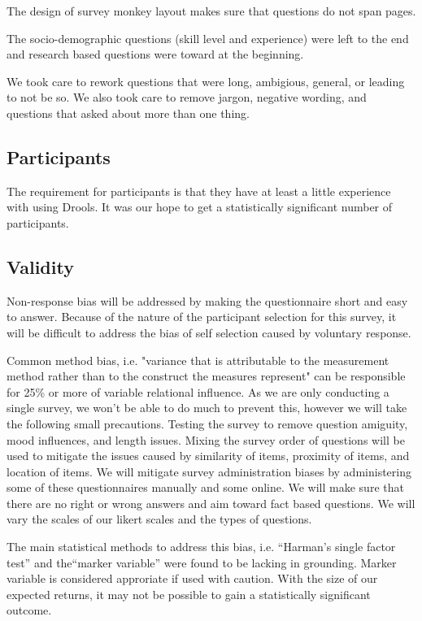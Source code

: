 The design of survey monkey layout makes sure that questions do not span pages.

The socio-demographic questions (skill level and experience) were left to the end and research based questions were toward at the beginning.

We took care to rework questions that were long, ambigious, general, or leading to not be so.
We also took care to remove jargon, negative wording, and questions that asked about more than one thing.

\subsection{Participants}

The requirement for participants is that they have at least a little experience with using Drools.
It was our hope to get a statistically significant number of participants.

\subsection{Validity}
Non-response bias\cite{armstrong1977estimating} will be addressed by making the questionnaire short and easy to answer.
Because of the nature of the participant selection for this survey, it will be difficult to address the bias of self selection caused by voluntary response.

Common method bias, i.e. "variance that is attributable to the measurement method rather than to the construct the measures represent"\cite{podsakoff2003common} can be responsible for 25\% or more of variable relational influence.
As we are only conducting a single survey, we won't be able to do much to prevent this, however we will take the following small precautions.
Testing the survey to remove question amiguity, mood influences, and length issues.
Mixing the survey order of questions will be used to mitigate the issues caused by similarity of items, proximity of items, and location of items.
We will mitigate survey administration biases by administering some of these questionnaires manually and some online.
We will make sure that there are no right or wrong answers and aim toward fact based questions.
We will vary the scales of our likert scales and the types of questions.

The main statistical methods to address this bias, i.e. ``Harman's single factor test''\cite{podsakoff2003common} and the``marker variable''\cite{lindell2001accounting} were found to be lacking in grounding\cite{gorrell2011countering}.
Marker variable is considered approriate if used with caution.
With the size of our expected returns, it may not be possible to gain a statistically significant outcome.

